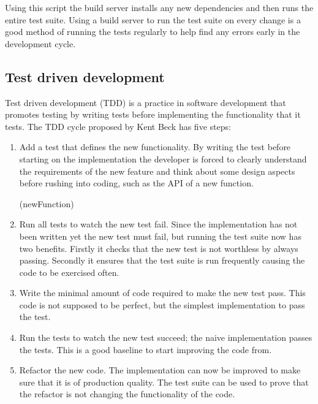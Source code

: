 
\noindent
Using this script the build server installs any new dependencies and then runs the
entire test suite. Using a build server to run the test suite on every change is a
good method of running the tests regularly to help find any errors early in the
development cycle.

\subsection{Test driven development}

Test driven development (TDD) is a practice in software development that promotes testing
by writing tests before implementing the functionality that it tests. The TDD cycle
proposed by Kent Beck has five steps:\cite{beck2003}

\begin{enumerate}
\item Add a test that defines the new functionality. By writing the test before starting on
	the implementation the developer is forced to clearly understand the requirements of
	the new feature and think about some design aspects before rushing into coding,
	such as the API of a new function.

\functions(newFunction)
\item Run all tests to watch the new test fail. Since the implementation has not been written
	yet the new test must fail, but running the test suite now has two benefits. Firstly
	it checks that the new test is not worthless by always passing. Secondly it ensures
	that the test suite is run frequently causing the code to be exercised often.

\item Write the minimal amount of code required to make the new test pass. This code is not
	supposed to be perfect, but the simplest implementation to pass the test.

\item Run the tests to watch the new test succeed; the naive implementation passes the tests.
	This is a good baseline to start improving the code from.

\item Refactor the new code. The implementation can now be improved to make sure that it is
	of production quality. The test suite can be used to prove that the refactor is not
	changing the functionality of the code.
\end{enumerate}

